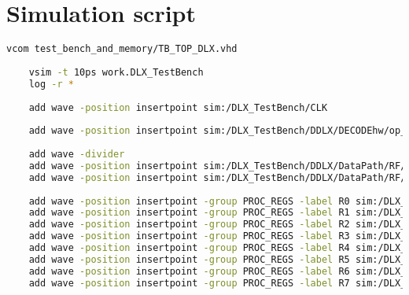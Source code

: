 \section{Simulation script}
\begin{lstlisting}[language=bash,caption={Tcl script for staring the simulation and add the registers from R0 to R31}]
	vcom test_bench_and_memory/TB_TOP_DLX.vhd
	
	vsim -t 10ps work.DLX_TestBench
	log -r *
	
	add wave -position insertpoint sim:/DLX_TestBench/CLK
	
	add wave -position insertpoint sim:/DLX_TestBench/DDLX/DECODEhw/op_code sim:/DLX_TestBench/DDLX/DECODEhw/ADD_RS1 sim:/DLX_TestBench/DDLX/DECODEhw/ADD_RS2 sim:/DLX_TestBench/DDLX/DECODEhw/ADD_WS1
	
	add wave -divider
	add wave -position insertpoint sim:/DLX_TestBench/DDLX/DataPath/RF/DATAIN
	add wave -position insertpoint sim:/DLX_TestBench/DDLX/DataPath/RF/ADD_WR
	
	add wave -position insertpoint -group PROC_REGS -label R0 sim:/DLX_TestBench/DDLX/DataPath/RF/REGS(0)/GLOB_BLK/BLOCK_GLOB/Q
	add wave -position insertpoint -group PROC_REGS -label R1 sim:/DLX_TestBench/DDLX/DataPath/RF/REGS(1)/GLOB_BLK/BLOCK_GLOB/Q
	add wave -position insertpoint -group PROC_REGS -label R2 sim:/DLX_TestBench/DDLX/DataPath/RF/REGS(2)/GLOB_BLK/BLOCK_GLOB/Q
	add wave -position insertpoint -group PROC_REGS -label R3 sim:/DLX_TestBench/DDLX/DataPath/RF/REGS(3)/GLOB_BLK/BLOCK_GLOB/Q
	add wave -position insertpoint -group PROC_REGS -label R4 sim:/DLX_TestBench/DDLX/DataPath/RF/REGS(4)/GLOB_BLK/BLOCK_GLOB/Q
	add wave -position insertpoint -group PROC_REGS -label R5 sim:/DLX_TestBench/DDLX/DataPath/RF/REGS(5)/GLOB_BLK/BLOCK_GLOB/Q
	add wave -position insertpoint -group PROC_REGS -label R6 sim:/DLX_TestBench/DDLX/DataPath/RF/REGS(6)/GLOB_BLK/BLOCK_GLOB/Q
	add wave -position insertpoint -group PROC_REGS -label R7 sim:/DLX_TestBench/DDLX/DataPath/RF/REGS(7)/GLOB_BLK/BLOCK_GLOB/Q
	

\end{lstlisting}
